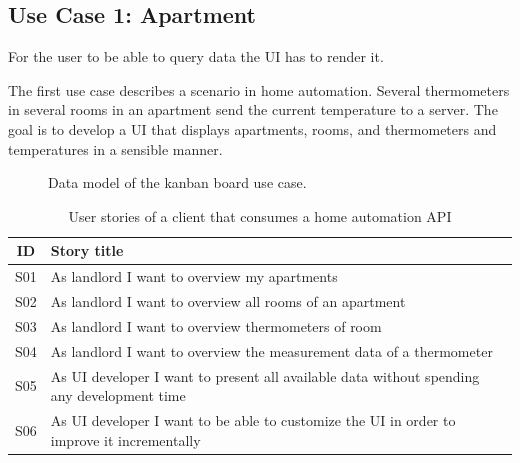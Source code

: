 \subsection{Use Case 1: Apartment}\label{usecases}
For the user to be able to query data the UI has to render it.

The first use case describes a scenario in home automation. Several thermometers in several rooms in an apartment send the current temperature to a server. The goal is to develop a UI that displays apartments, rooms, and thermometers and temperatures in a sensible manner.

\begin{figure}[!htb]
  \caption{\label{fig:my-label} Data model of the kanban board use case.}
\end{figure}

\begin{table}
\begin{center}
\begin{tabular}{ |c|l| }
 \hline
 ID & Story title \\
 \hline
 S01 & As landlord I want to overview my apartments \\
 S02 & As landlord I want to overview all rooms of an apartment \\
 S03 & As landlord I want to overview thermometers of room \\
 S04 & As landlord I want to overview the measurement data of a thermometer \\
 S05 & As UI developer I want to present all available data without spending any development time \\
 S06 & As UI developer I want to be able to customize the UI in order to improve it incrementally \\
 \hline
\end{tabular}
\caption{User stories of a client that consumes a home automation API}
\end{center}
\end{table}


